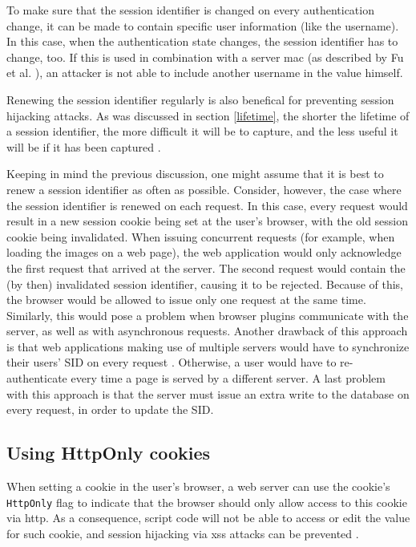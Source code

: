 To make sure that the session identifier is changed on every authentication change, it can be made to contain specific user information (like the username). In this case, when the authentication state changes, the session identifier has to change, too. If this is used in combination with a server \gls{mac} (as described by Fu et al. \cite{Fu2001}), an attacker is not able to include another username in the value himself.

Renewing the session identifier regularly is also benefical for preventing session hijacking attacks. As was discussed in section \ref{lifetime}, the shorter the lifetime of a session identifier, the more difficult it will be to capture, and the less useful it will be if it has been captured \cite{Fu2001}.

Keeping in mind the previous discussion, one might assume that it is best to renew a session identifier as often as possible. Consider, however, the case where the session identifier is renewed on each request. In this case, every request would result in a new session cookie being set at the user's browser, with the old session cookie being invalidated. When issuing concurrent requests (for example, when loading the images on a web page), the web application would only acknowledge the first request that arrived at the server. The second request would contain the (by then) invalidated session identifier, causing it to be rejected. Because of this, the browser would be allowed to issue only one request at the same time. Similarly, this would pose a problem when browser plugins communicate with the server, as well as with asynchronous requests. Another drawback of this approach is that web applications making use of multiple servers would have to synchronize their users' SID on every request \cite{Dacosta2011}. Otherwise, a user would have to re-authenticate every time a page is served by a different server. A last problem with this approach is that the server must issue an extra write to the database on every request, in order to update the SID.

\subsection{Using HttpOnly cookies}\label{httponly}

When setting a cookie in the user's browser, a web server can use the cookie's \texttt{HttpOnly} flag to indicate that the browser should only allow access to this cookie via \gls{http}. As a consequence, script code will not be able to access or edit the value for such cookie, and session hijacking via \gls{xss} attacks can be prevented \cite{HttpOnly}.

